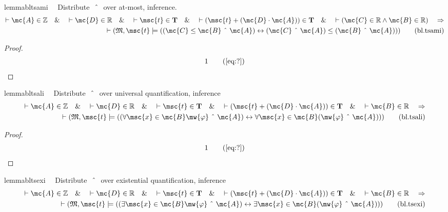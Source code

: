 \begin{restatable}{lemma}{bltsami}~~ Distribute $~\string^~$ over at-most,
inference.
\begin{align}
\vdash \mc{A} \in \mathbb{Z}\quad\&\quad \vdash \mc{D} \in
    \mathbb{R}\quad\&\quad \vdash \msc{t} \in \mathbf{T}\quad\&\quad \vdash (
    \msc{t} + ( \mc{D} \cdot \mc{A} ) ) \in \mathbf{T}\quad\&\quad \vdash (
    \mc{C} \in \mathbb{R} \wedge \mc{B} \in \mathbb{R} )\quad\Rightarrow \notag \\ 
	\quad
    \vdash ( \mathfrak{M} , \msc{t} \models ( ( \mc{C} \le \mc{B} ~\string^~
    \mc{A} ) \leftrightarrow ( \mc{C} ~\string^~ \mc{A} ) \le ( \mc{B}
    ~\string^~ \mc{A} ) ) )\label{eq:bl.tsami}\tag{bl.tsami}
\end{align}
\end{restatable}

\begin{proof}
\begin{align}
  1 &&  & &(\mbox{\ref{eq:?}})\notag
\end{align}
\end{proof}

\begin{restatable}{lemma}{bltsali}~~ Distribute $~\string^~$ over universal
quantification, inference
\begin{align}
\vdash \mc{A} \in \mathbb{Z}\quad\&\quad \vdash \mc{D} \in
    \mathbb{R}\quad\&\quad \vdash \msc{t} \in \mathbf{T}\quad\&\quad \vdash (
    \msc{t} + ( \mc{D} \cdot \mc{A} ) ) \in \mathbf{T}\quad\&\quad \vdash
    \mc{B} \in \mathbb{R}\quad\Rightarrow \notag \\ 
	\quad \vdash ( \mathfrak{M} , \msc{t}
    \models ( ( \forall \msc{x} \in \mc{B} \mw{\varphi} ~\string^~ \mc{A} )
    \leftrightarrow \forall \msc{x} \in \mc{B} ( \mw{\varphi} ~\string^~ \mc{A}
    ) ) )\label{eq:bl.tsali}\tag{bl.tsali}
\end{align}
\end{restatable}

\begin{proof}
\begin{align}
  1 &&  & &(\mbox{\ref{eq:?}})\notag
\end{align}
\end{proof}

\begin{restatable}{lemma}{bltsexi}~~ Distribute $~\string^~$ over existential
quantification, inference
\begin{align}
\vdash \mc{A} \in \mathbb{Z}\quad\&\quad \vdash \mc{D} \in
    \mathbb{R}\quad\&\quad \vdash \msc{t} \in \mathbf{T}\quad\&\quad \vdash (
    \msc{t} + ( \mc{D} \cdot \mc{A} ) ) \in \mathbf{T}\quad\&\quad \vdash
    \mc{B} \in \mathbb{R}\quad\Rightarrow \notag \\ 
	\quad \vdash ( \mathfrak{M} , \msc{t}
    \models ( ( \exists \msc{x} \in \mc{B} \mw{\varphi} ~\string^~ \mc{A} )
    \leftrightarrow \exists \msc{x} \in \mc{B} ( \mw{\varphi} ~\string^~ \mc{A}
    ) ) )\label{eq:bl.tsexi}\tag{bl.tsexi}
\end{align}
\end{restatable}

